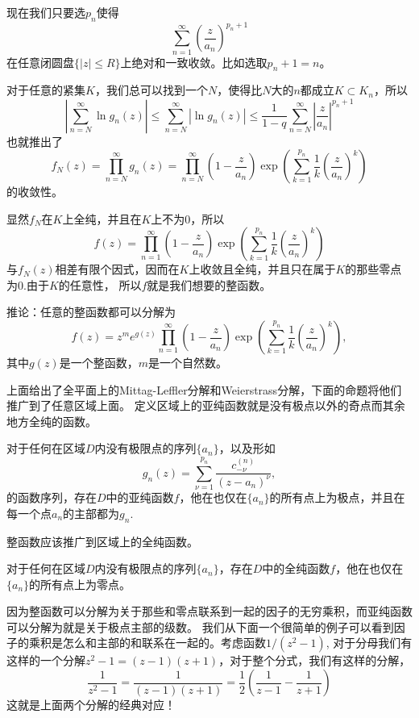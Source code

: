 现在我们只要选$p_n$使得
\[
\sum_{n=1}^\infty\left(\frac{z}{a_n}\right)^{p_n+1}
\]
在任意闭圆盘$\{|z|\leq R\}$上绝对和一致收敛。比如选取$p_n+1=n$。

对于任意的紧集$K$，我们总可以找到一个$N$，使得比$N$大的$n$都成立$K \subset K_n$，所以
\[
\left|\sum_{n=N}^\infty\ln g_n(z)\right|\leq \sum_{n=N}^\infty|\ln g_n(z)|\leq \frac{1}{1-q}\sum_{n=N}^\infty
\left|\frac{z}{a_n}\right|^{p_n+1}
\]
也就推出了
\[
f_N(z)=\prod_{n=N}^\infty  g_n(z)=\prod_{n=N}^\infty  \left(1-\frac{z}{a_n}\right)\exp\left(\sum_{k=1}^{p_n}
\frac{1}{k}\left(\frac{z}{a_n}\right)^k\right)
\]
的收敛性。

显然$f_N$在$K$上全纯，并且在$K$上不为0，所以
\[
f(z)=\prod_{n=1}^\infty  \left(1-\frac{z}{a_n}\right)\exp\left(\sum_{k=1}^{p_n}\frac{1}{k}\left(\frac{z}{a_n}
\right)^k\right)
\]
与$f_N(z)$相差有限个因式，因而在$K$上收敛且全纯，并且只在属于$K$的那些零点为0.由于$K$的任意性，
所以$f$就是我们想要的整函数。

推论：任意的整函数都可以分解为
\[
f(z)=z^me^{g(z)}\prod_{n=1}^\infty  \left(1-\frac{z}{a_n}\right)\exp\left(\sum_{k=1}^{p_n}\frac{1}{k}
\left(\frac{z}{a_n}\right)^k\right),
\]
其中$g(z)$是一个整函数，$m$是一个自然数。

上面给出了全平面上的Mittag-Leffler分解和Weierstrass分解，下面的命题将他们推广到了任意区域上面。
定义区域上的亚纯函数就是没有极点以外的奇点而其余地方全纯的函数。

\begin{pro}
对于任何在区域$D$内没有极限点的序列$\{a_n\}$，以及形如
\[
    g_n(z)=\sum_{\nu=1}^{p_n}\frac{c^{(n)}_{-\nu}}{(z-a_n)^\nu},
\]
的函数序列，存在$D$中的亚纯函数$f$，他在也仅在$\{a_n\}$的所有点上为极点，并且在每一个点$a_n$的主部都为$g_n$.
\end{pro}

整函数应该推广到区域上的全纯函数。

\begin{pro}
对于任何在区域$D$内没有极限点的序列$\{a_n\}$，存在$D$中的全纯函数$f$，他在也仅在$\{a_n\}$的所有点上为零点。
\end{pro}

因为整函数可以分解为关于那些和零点联系到一起的因子的无穷乘积，而亚纯函数可以分解为就是关于极点主部的级数。
我们从下面一个很简单的例子可以看到因子的乘积是怎么和主部的和联系在一起的。考虑函数$1/(z^2-1)$,
对于分母我们有这样的一个分解$z^2-1=(z-1)(z+1)$，对于整个分式，我们有这样的分解，
\[\frac{1}{z^2-1}=\frac{1}{(z-1)(z+1)}=\frac{1}{2}\left(\frac{1}{z-1}-\frac{1}{z+1}\right)\]
这就是上面两个分解的经典对应！

